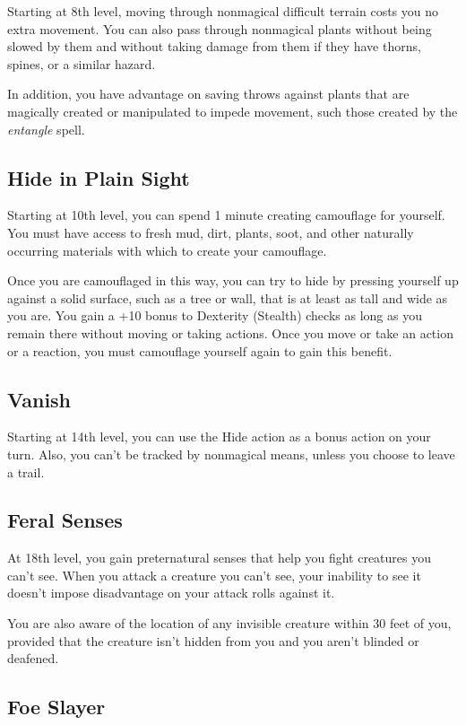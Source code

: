 Starting at 8th level, moving through nonmagical difficult terrain costs you no extra movement. You can also pass through nonmagical plants without being slowed by them and without taking damage from them if they have thorns, spines, or a similar hazard.

In addition, you have advantage on saving throws against plants that are magically created or manipulated to impede movement, such those created by the \textit{entangle} spell.

\subsection{Hide in Plain Sight}

Starting at 10th level, you can spend 1 minute creating camouflage for yourself. You must have access to fresh mud, dirt, plants, soot, and other naturally occurring materials with which to create your camouflage.

Once you are camouflaged in this way, you can try to hide by pressing yourself up against a solid surface, such as a tree or wall, that is at least as tall and wide as you are. You gain a +10 bonus to Dexterity (Stealth) checks as long as you remain there without moving or taking actions. Once you move or take an action or a reaction, you must camouflage yourself again to gain this benefit.

\subsection{Vanish}

Starting at 14th level, you can use the Hide action as a bonus action on your turn. Also, you can’t be tracked by nonmagical means, unless you choose to leave a trail.

\subsection{Feral Senses}

At 18th level, you gain preternatural senses that help you fight creatures you can’t see. When you attack a creature you can’t see, your inability to see it doesn’t impose disadvantage on your attack rolls against it.

You are also aware of the location of any invisible creature within 30 feet of you, provided that the creature isn’t hidden from you and you aren’t blinded or deafened.

\subsection{Foe Slayer}

